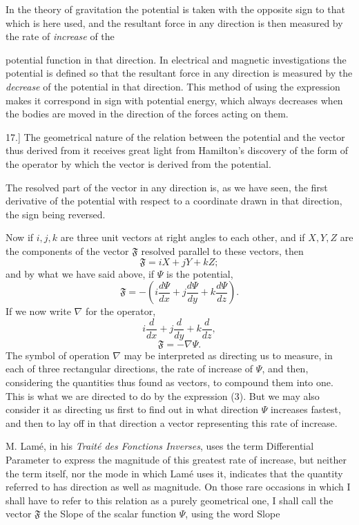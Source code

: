 \documentclass[11pt,a4paper]{article}
\begin{document}
In the theory of gravitation the potential is taken with the opposite
sign to that which is here used, and the resultant force in any
direction is then measured by the rate of \textit{increase} of the

\clearpage

potential function in that direction. In electrical and magnetic
investigations the potential is defined so that the resultant force in
any direction is measured by the \textit{decrease} of the potential in
that direction. This method of using the expression makes it correspond
in sign with potential energy, which always decreases when the bodies
are moved in the direction of the forces acting on them.

17.] The geometrical nature of the relation between the potential and
the vector thus derived from it receives great light from Hamilton's
discovery of the form of the operator by which the vector is derived
from the potential.

The resolved part of the vector in any direction is, as we have seen,
the first derivative of the potential with respect to a coordinate drawn
in that direction, the sign being reversed.

Now if \(i,j,k\) are three unit vectors at right angles to each other,
and if \(X,Y,Z\) are the components of the vector \(\mathfrak{F}\)
resolved parallel to these vectors, then
\[
\mathfrak{F}=iX+jY+kZ; \tag{1}
\]
and by what we have said above, if \(\Psi\) is the potential,
\[
\mathfrak{F}=-\left(i\frac{d\Psi}{dx}+j\frac{d\Psi}{dy}
+k\frac{d\Psi}{dz}\right). \tag{2}
\]
If we now write \(\nabla\) for the operator,
\[
i\frac{d}{dx}+j\frac{d}{dy}+k\frac{d}{dz}, \tag{3}
\]
\[
\mathfrak{F}=-\nabla\Psi. \tag{4}
\]
The symbol of operation \(\nabla\) may be interpreted as directing us to
measure, in each of three rectangular directions, the rate of increase
of \(\Psi\), and then, considering the quantities thus found as vectors,
to compound them into one. This is what we are directed to do by the
expression (3). But we may also consider it as directing us first to
find out in what direction \(\Psi\) increases fastest, and then to lay
off in that direction a vector representing this rate of increase.

M. Lamé, in his \textit{Traité des Fonctions Inverses}, uses the term
Differential Parameter to express the magnitude of this greatest rate of
increase, but neither the term itself, nor the mode in which Lamé uses
it, indicates that the quantity referred to has direction as well as
magnitude. On those rare occasions in which I shall have to refer to
this relation as a purely geometrical one, I shall call the vector
\(\mathfrak{F}\) the Slope of the scalar function \(\Psi\), using the
word Slope
\end{document}
